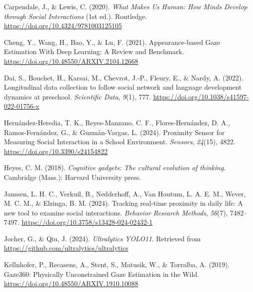 \documentclass[
  man,floatsintext]{apa6}
\newlength{\cslhangindent}
\newenvironment{CSLReferences}[2] %
 {\begin{list}{}{%
  \setlength{\itemindent}{0pt}
  \setlength{\leftmargin}{0pt}
  \setlength{\parsep}{0pt}
  \ifodd #1
   \setlength{\leftmargin}{\cslhangindent}
   \setlength{\itemindent}{-1\cslhangindent}
  \fi
  \setlength{\itemsep}{#2\baselineskip}}}
 {\end{list}}
\begin{document}
\label{refs}
\begin{CSLReferences}{1}{0}
Carpendale, J., \& Lewis, C. (2020). \emph{What {Makes Us Human}: {How Minds Develop} through {Social Interactions}} (1st ed.). Routledge. \url{https://doi.org/10.4324/9781003125105}

Cheng, Y., Wang, H., Bao, Y., \& Lu, F. (2021). Appearance-based {Gaze Estimation With Deep Learning}: {A Review} and {Benchmark}. \url{https://doi.org/10.48550/ARXIV.2104.12668}

Dai, S., Bouchet, H., Karsai, M., Chevrot, J.-P., Fleury, E., \& Nardy, A. (2022). Longitudinal data collection to follow social network and language development dynamics at preschool. \emph{Scientific Data}, \emph{9}(1), 777. \url{https://doi.org/10.1038/s41597-022-01756-x}

Hernández-Heredia, T. K., Reyes-Manzano, C. F., Flores-Hernández, D. A., Ramos-Fernández, G., \& Guzmán-Vargas, L. (2024). Proximity {Sensor} for {Measuring Social Interaction} in a {School Environment}. \emph{Sensors}, \emph{24}(15), 4822. \url{https://doi.org/10.3390/s24154822}

Heyes, C. M. (2018). \emph{Cognitive gadgets: The cultural evolution of thinking}. Cambridge (Mass.): Harvard University press.

Janssen, L. H. C., Verkuil, B., Nedderhoff, A., Van Houtum, L. A. E. M., Wever, M. C. M., \& Elzinga, B. M. (2024). Tracking real-time proximity in daily life: {A} new tool to examine social interactions. \emph{Behavior Research Methods}, \emph{56}(7), 7482--7497. \url{https://doi.org/10.3758/s13428-024-02432-1}

Jocher, G., \& Qiu, J. (2024). \emph{Ultralytics {YOLO11}}. Retrieved from \url{https://github.com/ultralytics/ultralytics}

Kellnhofer, P., Recasens, A., Stent, S., Matusik, W., \& Torralba, A. (2019). Gaze360: {Physically Unconstrained Gaze Estimation} in the {Wild}. \url{https://doi.org/10.48550/ARXIV.1910.10088}


\end{CSLReferences}
\end{document}
